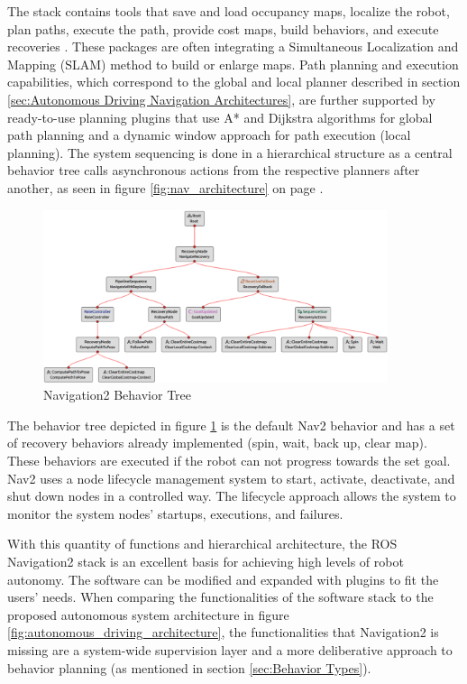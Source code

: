 The stack contains tools that save and load occupancy maps, localize the robot, plan paths, execute the path, provide cost maps, build behaviors, and execute recoveries \cite{macenski2020}. These packages are often integrating a Simultaneous Localization and Mapping (SLAM) method to build or enlarge maps. Path planning and execution capabilities, which correspond to the global and local planner described in section \ref{sec:Autonomous Driving Navigation Architectures}, are further supported by ready-to-use planning plugins that use A* and Dijkstra algorithms for global path planning and a dynamic window approach for path execution (local planning). The system sequencing is done in a hierarchical structure as a central behavior tree calls asynchronous actions from the respective planners after another, as seen in figure \ref{fig:nav_architecture} on page \pageref{fig:nav_architecture}. 

\begin{figure}[ht]
	\centering
	\includegraphics[width=0.9\textwidth]{images/nav_bt-modified.png}
	\caption{Navigation2 Behavior Tree}
	\label{fig:bt_nav}
\end{figure}

The behavior tree depicted in figure \ref{fig:bt_nav} is the default Nav2 behavior and has a set of recovery behaviors already implemented (spin, wait, back up, clear map). These behaviors are executed if the robot can not progress towards the set goal. Nav2 uses a node lifecycle management system to start, activate, deactivate, and shut down nodes in a controlled way. The lifecycle approach allows the system to monitor the system nodes' startups, executions, and failures.

With this quantity of functions and hierarchical architecture, the ROS Navigation2 stack is an excellent basis for achieving high levels of robot autonomy. The software can be modified and expanded with plugins to fit the users' needs. When comparing the functionalities of the software stack to the proposed autonomous system architecture in figure 	\ref{fig:autonomous_driving_architecture}, the functionalities that Navigation2 is missing are a system-wide supervision layer and a more deliberative approach to behavior planning (as mentioned in section \ref{sec:Behavior Types}).

